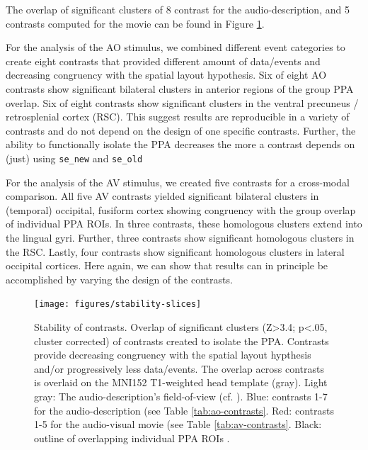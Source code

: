 \documentclass[english]{article}
\begin{document}
The overlap of significant clusters of 8 contrast for the audio-description, and
5 contrasts computed for the movie can be found in Figure
\ref{fig:stability-slices}.

For the analysis of the AO stimulus, we combined different event categories to
create eight contrasts that provided different amount of data/events and
decreasing congruency with the spatial layout hypothesis.
Six of eight AO contrasts show significant bilateral clusters in anterior
regions of the group PPA overlap.
Six of eight contrasts show significant clusters in the ventral precuneus /
retrosplenial cortex (RSC).
This suggest results are reproducible in a variety of contrasts and do not
depend on the design of one specific contrasts.
Further, the ability to functionally isolate the PPA decreases the more a
contrast depends on (just) using \texttt{se\_new} and \texttt{se\_old}

For the analysis of the AV stimulus, we created five contrasts for a cross-modal
comparison.
All five AV contrasts yielded significant bilateral clusters in (temporal)
occipital, fusiform cortex showing congruency with the group overlap of
individual PPA ROIs.
In three contrasts, these homologous clusters extend into the lingual gyri.
Further, three contrasts show significant homologous clusters in the RSC.
Lastly, four contrasts show significant homologous clusters in lateral occipital
cortices.
Here again, we can show that results can in principle be accomplished by varying
the design of the contrasts.

\begin{figure} \centering
    \texttt{[image: figures/stability-slices]}
    \caption{Stability of contrasts. Overlap of significant clusters (Z>3.4;
        p<.05, cluster corrected) of contrasts created to isolate the PPA.
        Contrasts provide decreasing congruency with the spatial layout
        hypthesis and/or progressively less data/events. The overlap across
        contrasts is overlaid on the MNI152 T1-weighted head template (gray).
        Light gray: The audio-description's field-of-view (cf.
        \citep{hanke2014audiomovie}). Blue: contrasts 1-7 for the
        audio-description (see Table \ref{tab:ao-contrasts}. Red: contrasts 1-5
        for the audio-visual movie (see Table \ref{tab:av-contrasts}. Black:
        outline of overlapping individual PPA ROIs
        \citep{sengupta2016extension}.} \label{fig:stability-slices}
    \end{figure}
\end{document}
